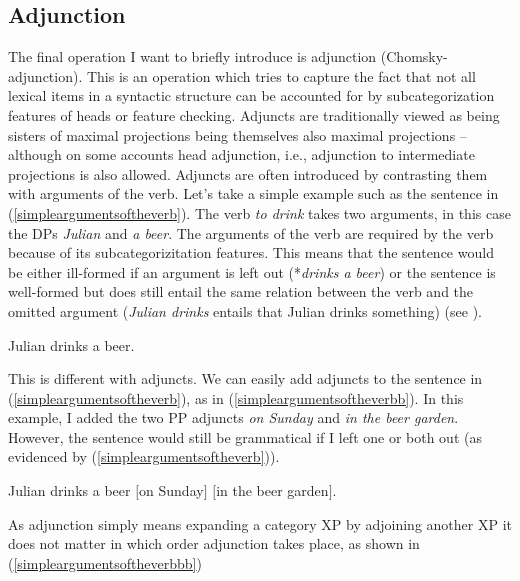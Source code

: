 \subsection{Adjunction}\label{generaladjunction}
The final operation I want to briefly introduce is adjunction (Chomsky-ad\-junc\-tion). This is an operation which tries to capture the fact that not all lexical items in a syntactic structure can be accounted for by subcategorization features of heads or feature checking. Adjuncts are traditionally viewed as being sisters of maximal projections being themselves also maximal projections -- although on some accounts head adjunction, i.e., adjunction to intermediate projections is also allowed. Adjuncts are often introduced by contrasting them with arguments of the verb. Let's take a simple example such as the sentence in (\ref{simpleargumentsoftheverb}). The verb \textit{to drink} takes two arguments, in this case the DPs \textit{Julian} and \textit{a beer}. The arguments of the verb are required by the verb because of its subcategorizitation features. This means that the sentence would be either ill-formed if an argument is left out (*\textit{drinks a beer}) or the sentence is well-formed but does still entail the same relation between the verb and the omitted argument (\textit{Julian drinks} entails that Julian drinks something) (see \citealt{hole2015arguments}).

\begin{exe}
\ex\label{simpleargumentsoftheverb} Julian drinks a beer.
\end{exe}

\noindent This is different with adjuncts. We can easily add adjuncts to the sentence in (\ref{simpleargumentsoftheverb}), as in (\ref{simpleargumentsoftheverbb}). In this example, I added the two PP adjuncts \textit{on Sunday} and \textit{in the beer garden}. However, the sentence would still be grammatical if I left one or both out (as evidenced by (\ref{simpleargumentsoftheverb})). 

\begin{exe}
\ex\label{simpleargumentsoftheverbb} Julian drinks a beer $[$on Sunday$]$ $[$in the beer garden$]$.
\end{exe}

\noindent As adjunction simply means expanding a category XP by adjoining another XP it does not matter in which order adjunction takes place, as shown in (\ref{simpleargumentsoftheverbbb})

